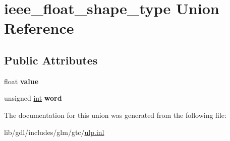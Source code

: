 \hypertarget{unionieee__float__shape__type}{}\section{ieee\+\_\+float\+\_\+shape\+\_\+type Union Reference}
\label{unionieee__float__shape__type}
\subsection*{Public Attributes}
\begin{DoxyCompactItemize}
\item 
\hypertarget{unionieee__float__shape__type_aa0c47451f1b974421cbb9e2833ddb68e}{}float {\bfseries value}\label{unionieee__float__shape__type_aa0c47451f1b974421cbb9e2833ddb68e}

\item 
\hypertarget{unionieee__float__shape__type_a49230c21acd672d044f38b1abcbd6071}{}unsigned \hyperlink{_s_d_l__thread_8h_a6a64f9be4433e4de6e2f2f548cf3c08e}{int} {\bfseries word}\label{unionieee__float__shape__type_a49230c21acd672d044f38b1abcbd6071}

\end{DoxyCompactItemize}


The documentation for this union was generated from the following file\+:\begin{DoxyCompactItemize}
\item 
lib/gdl/includes/glm/gtc/\hyperlink{ulp_8inl}{ulp.\+inl}\end{DoxyCompactItemize}
